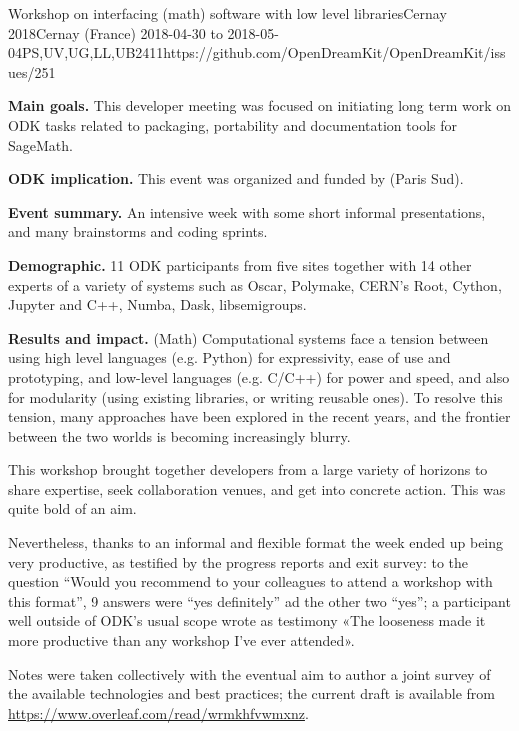 \begin{event}{Workshop on interfacing (math) software with low level libraries}{Cernay 2018}{Cernay (France) 2018-04-30 to 2018-05-04}{PS,UV,UG,LL,UB}{24}{11}{https://github.com/OpenDreamKit/OpenDreamKit/issues/251}

  \textbf{Main goals.} This developer meeting was focused on
  initiating long term work on ODK tasks related to packaging,
  portability and documentation tools for SageMath.

  \textbf{ODK implication.} This event was organized and funded by
  \ODK (Paris Sud).

  \textbf{Event summary.} An intensive week with some short informal
  presentations, and many brainstorms and coding sprints.

  \textbf{Demographic.} 11 ODK participants from five sites together
  with 14 other experts of a variety of systems such as Oscar,
  Polymake, CERN's Root, Cython, Jupyter and C++, Numba, Dask,
  libsemigroups.

  \textbf{Results and impact.} (Math) Computational systems face a
  tension between using high level languages (e.g. Python) for
  expressivity, ease of use and prototyping, and low-level languages
  (e.g. C/C++) for power and speed, and also for modularity (using
  existing libraries, or writing reusable ones). To resolve this
  tension, many approaches have been explored in the recent years, and
  the frontier between the two worlds is becoming increasingly blurry.

  This workshop brought together developers from a large variety of
  horizons to share expertise, seek collaboration venues, and get into
  concrete action. This was quite bold of an aim.

  Nevertheless, thanks to an informal and flexible format the week
  ended up being very productive, as testified by the progress reports
  and exit survey: to the question “Would you recommend to your
  colleagues to attend a workshop with this format”, 9 answers were
  ``yes definitely'' ad the other two ``yes''; a participant well
  outside of ODK's usual scope wrote as testimony «The looseness made
  it more productive than any workshop I've ever attended».

  Notes were taken collectively with the eventual aim to author a
  joint survey of the available technologies and best practices; the
  current draft is available from
  \url{https://www.overleaf.com/read/wrmkhfvwmxnz}.
\end{event}
